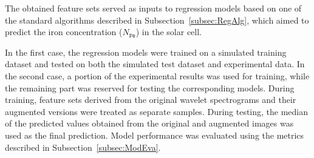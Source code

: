 \documentclass[10pt]{iopart}
\begin{document}
The obtained feature sets served as inputs to regression models based on one of the standard algorithms described in Subsection~\ref{subsec:RegAlg}, 
which aimed to predict the iron concentration ($N_\mathtt{Fe}$) in the solar cell.

In the first case, the regression models were trained on a simulated training dataset and tested on both the simulated test dataset and experimental data.
In the second case, a portion of the experimental results was used for training, while the remaining part was reserved for testing the corresponding models.
During training, feature sets derived from the original wavelet spectrograms and their augmented versions were treated as separate samples.
During testing, the median of the predicted values obtained from the original and augmented images was used as the final prediction.
Model performance was evaluated using the metrics described in Subsection~\ref{subsec:ModEva}.
\end{document}
